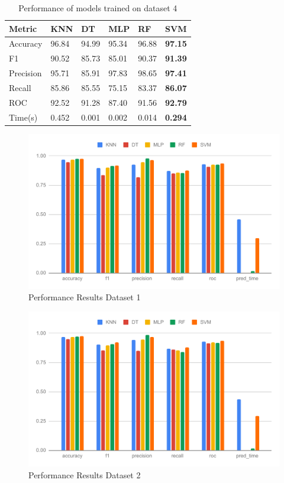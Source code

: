 \begin{table}[hbt]
\caption{Performance of models trained on dataset 4} \label{tab:performance_of_models_trained_on_dataset_4}
\begin{tabular*}{\tblwidth}{@{}LLLLLL@{}}
    \toprule
    Metric & KNN & DT & MLP & RF & \textbf{SVM} \\
    \midrule
    Accuracy & 96.84 & 94.99 & 95.34 & 96.88 & \textbf{97.15} \\
    F1 & 90.52 & 85.73 & 85.01 & 90.37 & \textbf{91.39} \\
    Precision & 95.71 & 85.91 & 97.83 & 98.65 & \textbf{97.41} \\
    Recall & 85.86 & 85.55 & 75.15 & 83.37 & \textbf{86.07} \\
    ROC & 92.52 & 91.28 & 87.40 & 91.56 & \textbf{92.79} \\
    Time(s) & 0.452 & 0.001 & 0.002 & 0.014 & \textbf{0.294} \\
    \bottomrule
\end{tabular*}
\end{table}

\begin{figure}[btp]
    \centering
    \includegraphics[width=0.9\columnwidth]{media/results/perf_ds_1.pdf}
    \caption{Performance Results Dataset 1} \label{fig:perfromance_results_dataset_1}
\end{figure}

\begin{figure}[btp]
    \centering
    \includegraphics[width=0.9\columnwidth]{media/results/perf_ds_2.pdf}
    \caption{Performance Results Dataset 2} \label{fig:perfromance_results_dataset_2}
\end{figure}

